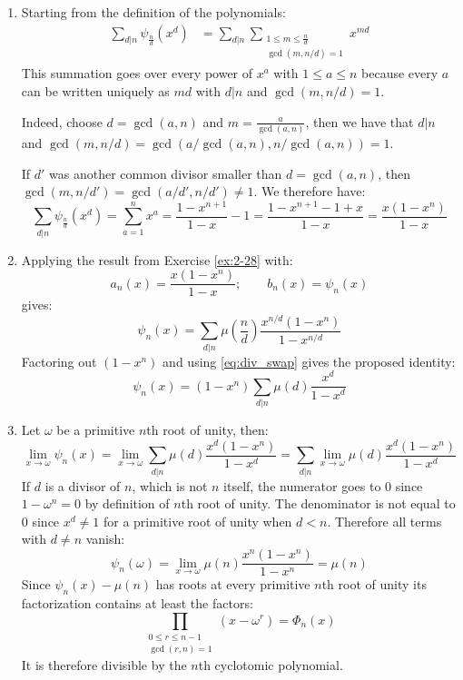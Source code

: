 \begin{solution}
    \begin{enumerate}[label=(\alph*)]
        \item Starting from the definition of the polynomials:
        \begin{align*}
            \sum_{d\vert n} \psi_{\frac{n}{d}}(x^d) &= \sum_{d\vert n} \sum_{\substack{1\leq m\leq \frac{n}{d} \\ \gcd(m,n/d)=1}} x^{md}
        \end{align*}
        This summation goes over every power of $x^a$ with $1\leq a\leq n$ because every $a$ can be written uniquely as $md$ with $d\vert n$ and $\gcd(m,n/d)=1$. 
        
        Indeed, choose $d=\gcd(a,n)$ and $m=\frac{a}{\gcd(a,n)}$, then we have that $d\vert n$ and $\gcd(m,n/d) = \gcd(a/\gcd(a,n), n/\gcd(a,n))= 1$. 
        
        If $d'$ was another common divisor smaller than $d=\gcd(a,n)$, then $\gcd(m,n/d') = \gcd(a/d',n/d') \neq 1$. We therefore have:
        \[
            \sum_{d\vert n} \psi_{\frac{n}{d}}(x^d) = \sum_{a=1}^n x^a = \frac{1-x^{n+1}}{1-x} - 1 = \frac{1-x^{n+1} - 1 +x}{1-x} = \frac{x(1-x^n)}{1-x}
        \]
        \item Applying the result from Exercise \ref{ex:2-28} with:
        \[
            a_n(x) = \frac{x(1-x^n)}{1-x}; \qquad b_n(x) = \psi_n(x)
        \]
        gives:
        \[
            \psi_n(x) = \sum_{d\vert n}\mu\left(\frac{n}{d}\right)\frac{x^{n/d}(1-x^n)}{1-x^{n/d}}
        \]
        Factoring out $(1-x^n)$ and using \eqref{eq:div_swap} gives the proposed identity:
        \[
            \psi_n(x) = (1-x^n) \sum_{d\vert n}\mu(d) \frac{x^d}{1-x^d}
        \]
        \item Let $\omega$ be a primitive $n$th root of unity, then:
        \[
            \lim_{x\to\omega} \psi_n(x) = \lim_{x\to\omega} \sum_{d\vert n} \mu(d) \frac{x^d(1-x^n)}{1-x^d} =  \sum_{d\vert n} \lim_{x\to\omega} \mu(d) \frac{x^d(1-x^n)}{1-x^d}
        \]
        If $d$ is a divisor of $n$, which is not $n$ itself, the numerator goes to $0$ since $1-\omega^n = 0$ by definition of $n$th root of unity. The denominator is not equal to $0$ since $x^d \neq 1$ for a primitive root of unity when $d < n$. Therefore all terms with $d\neq n$ vanish:
        \[
            \psi_n(\omega) = \lim_{x\to\omega} \mu(n) \frac{x^n(1-x^n)}{1-x^n} = \mu(n)
        \]
        Since $\psi_n(x)-\mu(n)$ has roots at every primitive $n$th root of unity its factorization contains at least the factors:
        \[
            \prod_{\substack{0\leq r\leq n-1\\\gcd(r,n)=1}}(x-\omega^r) = \Phi_n(x)
        \]
        It is therefore divisible by the $n$th cyclotomic polynomial.
    \end{enumerate}
\end{solution}
